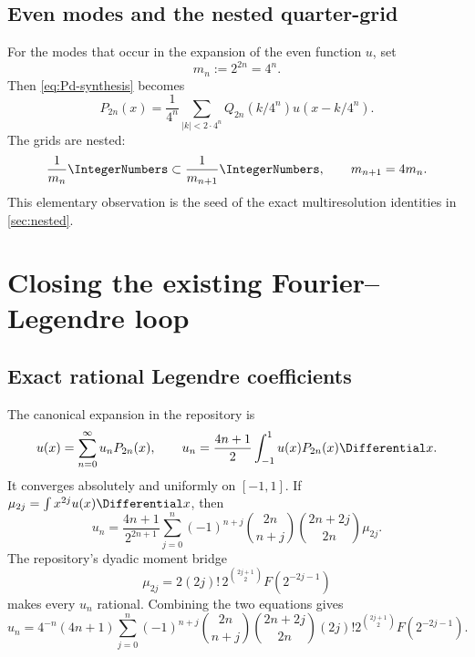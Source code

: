 \documentclass[11pt,oneside]{article}
\numberwithin{equation}{section}
\theoremstyle{definition}
\theoremstyle{remark}
\begin{document}
\subsection{Even modes and the nested quarter-grid}

For the modes that occur in the expansion of the even function $u$, set
\begin{equation}
 m_n:=2^{2n}=4^n.
 \label{eq:mn}
\end{equation}
Then \eqref{eq:Pd-synthesis} becomes
\begin{equation}
 \boxed{
 P_{2n}(x)=\frac1{4^n}
 \sum_{|k|<2\cdot4^n}Q_{2n}(k/4^n)u(x-k/4^n).}
 \label{eq:even-P-synthesis}
\end{equation}
The grids are nested:
\begin{equation}
 \frac1{m_n}\IntegerNumbers\subset\frac1{m_{n+1}}\IntegerNumbers,
 \qquad m_{n+1}=4m_n.
 \label{eq:nested-grids}
\end{equation}
This elementary observation is the seed of the exact multiresolution
identities in \cref{sec:nested}.

\section{Closing the existing Fourier--Legendre loop}
\label{sec:closing}

\subsection{Exact rational Legendre coefficients}

The canonical expansion in the repository is
\begin{equation}
 u(x)=\sum_{n=0}^{\infty}u_nP_{2n}(x),
 \qquad
 u_n=\frac{4n+1}{2}\int_{-1}^{1}u(x)P_{2n}(x)\Differential x.
 \label{eq:legendre-series}
\end{equation}
It converges absolutely and uniformly on $[-1,1]$.  If
$\mu_{2j}=\int x^{2j}u(x)\Differential x$, then
\begin{equation}
 u_n=\frac{4n+1}{2^{2n+1}}
 \sum_{j=0}^{n}(-1)^{n+j}
 \binom{2n}{n+j}\binom{2n+2j}{2n}\mu_{2j}.
 \label{eq:un-moments}
\end{equation}
The repository's dyadic moment bridge
\begin{equation}
 \mu_{2j}=2(2j)!\,2^{\binom{2j+1}{2}}F(2^{-2j-1})
 \label{eq:moment-fabius}
\end{equation}
makes every $u_n$ rational.  Combining the two equations gives
\begin{equation}
 u_n=4^{-n}(4n+1)\sum_{j=0}^{n}(-1)^{n+j}
 \binom{2n}{n+j}\binom{2n+2j}{2n}(2j)!
 2^{\binom{2j+1}{2}}F(2^{-2j-1}).
 \label{eq:un-dyadic}
\end{equation}
\end{document}
